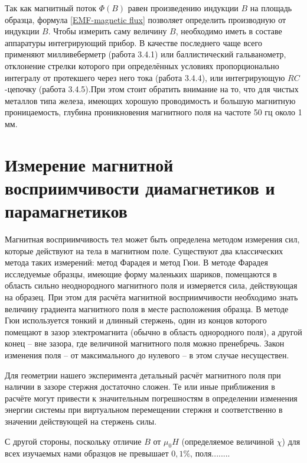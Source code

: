 Так как магнитный поток $\Phi (B)$ равен произведению индукции $B$ на площадь образца, формула \eqref{EMF-magnetic flux} позволяет определить производную от индукции $B$. Чтобы измерить саму величину $B$, необходимо иметь в составе аппаратуры интегрирующий прибор. В качестве последнего чаще всего применяют милливеберметр (работа 3.4.1) или баллистический гальванометр, отклонение стрелки которого при определённых условиях пропорционально интегралу от протекшего через него тока (работа 3.4.4), или интегрирующую $RC$-цепочку (работа 3.4.5).При этом стоит обратить внимание на то, что для чистых металлов типа железа, имеющих хорошую проводимость и большую магнитную проницаемость, глубина проникновения магнитного поля на частоте 50 гц около 1 мм. 


\section{Измерение магнитной восприимчивости диамагнетиков и парамагнетиков}

Магнитная восприимчивость тел может быть определена методом измерения сил, которые действуют на тела в магнитном поле. Существуют два классических метода таких измерений: метод Фарадея и метод Гюи. В методе Фарадея исследуемые образцы, имеющие форму маленьких шариков, помещаются в область сильно неоднородного магнитного поля и измеряется сила, действующая на образец. При этом для расчёта магнитной восприимчивости необходимо знать величину градиента магнитного поля в месте расположения образца. В методе Гюи используется тонкий и длинный стержень, один из концов которого помещают в зазор электромагнита (обычно в область однородного поля), а другой конец -- вне зазора, где величиной магнитного поля можно пренебречь. Закон изменения поля -- от максимального до нулевого -- в этом случае несуществен.

Для геометрии нашего эксперимента детальный расчёт магнитного поля при наличии в зазоре стержня достаточно сложен. Те или иные приближения в расчёте могут привести к значительным погрешностям в определении изменения энергии системы при виртуальном перемещении стержня и соответственно в значении действующей на стержень силы.

С другой стороны, поскольку отличие $B$ от $\mu_0 H$ (определяемое величиной $\chi$) для всех изучаемых нами образцов не превышает $0,1\%$, поля........
 
